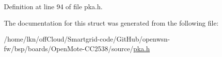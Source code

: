 Definition at line 94 of file pka.\+h.



The documentation for this struct was generated from the following file\+:\begin{DoxyCompactItemize}
\item 
/home/lkn/off\+Cloud/\+Smartgrid-\/code/\+Git\+Hub/openwsn-\/fw/bsp/boards/\+Open\+Mote-\/\+C\+C2538/source/\hyperlink{pka_8h}{pka.\+h}\end{DoxyCompactItemize}
